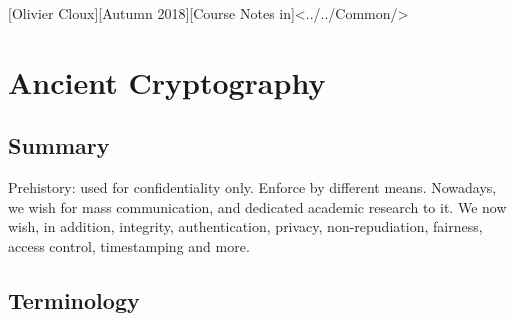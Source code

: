 \documentclass[11pt,a4paper]{article}
\begin{document}
[Olivier Cloux][Autumn 2018][Course Notes in]<../../Common/>
\tableofcontents
\newpage
\section{Ancient Cryptography}
\subsection{Summary}
Prehistory: used for confidentiality only. Enforce by different means. Nowadays, we wish for mass communication, and dedicated academic research to it. We now wish, in addition, integrity, authentication, privacy, non-repudiation, fairness, access control, timestamping and more. 
\subsection{Terminology}
\end{document}
